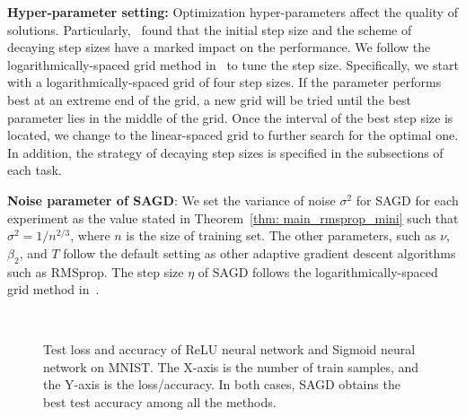 \documentclass[11pt]{article}
\begin{document}
\vspace{0.05in}
\textbf{Hyper-parameter setting:} Optimization hyper-parameters affect the quality of solutions. Particularly,~\citet{wiro17} found that the initial step size and the scheme of decaying step sizes have a marked impact on the performance. We follow the logarithmically-spaced grid method in~\citet{wiro17} to tune the step size. Specifically, we start with a logarithmically-spaced grid of four step sizes. If the parameter performs best at an extreme end of the grid, a new grid will be tried until the best parameter lies in the middle of the grid. Once the interval of the best step size is located, we change to the linear-spaced grid to further search for the optimal one. %
In addition, the strategy of decaying step sizes is specified in the subsections of each task. 

\vspace{0.05in}
\textbf{Noise parameter of \textsc{SAGD}}: We set the variance of noise $\sigma^2$ for \textsc{SAGD} for each experiment as the value stated in Theorem~\ref{thm: main_rmsprop_mini} such that $\sigma^2 = 1/n^{2/3}$, where $n$ is the size of training set. The other parameters, such as $\nu$, $\beta_2$, and $T$ follow the default setting as other adaptive gradient descent algorithms such as RMSprop. The step size $\eta$ of \textsc{SAGD} follows the logarithmically-spaced grid method in~\citet{wiro17}.



\begin{figure}[t!]
\mbox{
\hspace{-0.1in}
 }
 \caption[]{Test loss and accuracy of ReLU neural network and Sigmoid neural network on MNIST. The X-axis is the number of train samples, and the Y-axis is the loss/accuracy. In both cases, \textsc{SAGD} obtains the best test accuracy among all the methods.} 
 \label{fig:mnist}
\end{figure}
\end{document}
